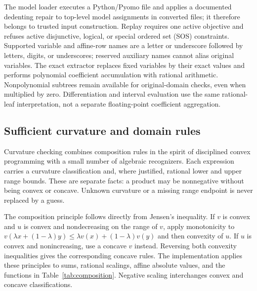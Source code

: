 The model loader executes a Python/Pyomo file and applies a documented dedenting repair to top-level model assignments in converted files; it therefore belongs to trusted input construction. Replay requires one active objective and refuses active disjunctive, logical, or special ordered set (SOS) constraints. Supported variable and affine-row names are a letter or underscore followed by letters, digits, or underscores; reserved auxiliary names cannot alias original variables. The exact extractor replaces fixed variables by their exact values and performs polynomial coefficient accumulation with rational arithmetic. Nonpolynomial subtrees remain available for original-domain checks, even when multiplied by zero. Differentiation and interval evaluation use the same rational-leaf interpretation, not a separate floating-point coefficient aggregation.

\subsection{Sufficient curvature and domain rules}
\label{sec:curvature-rules}
Curvature checking combines composition rules in the spirit of disciplined convex programming \citep{grant2006-dcp} with a small number of algebraic recognizers. Each expression carries a curvature classification and, where justified, rational lower and upper range bounds. These are separate facts: a product may be nonnegative without being convex or concave. Unknown curvature or a missing range endpoint is never replaced by a guess.

The composition principle follows directly from Jensen's inequality. If $v$ is convex and $u$ is convex and nondecreasing on the range of $v$, apply monotonicity to $v(\lambda x+(1-\lambda)y)\leq\lambda v(x)+(1-\lambda)v(y)$ and then convexity of $u$. If $u$ is convex and nonincreasing, use a concave $v$ instead. Reversing both convexity inequalities gives the corresponding concave rules. The implementation applies these principles to sums, rational scalings, affine absolute values, and the functions in Table~\ref{tab:composition}. Negative scaling interchanges convex and concave classifications.

